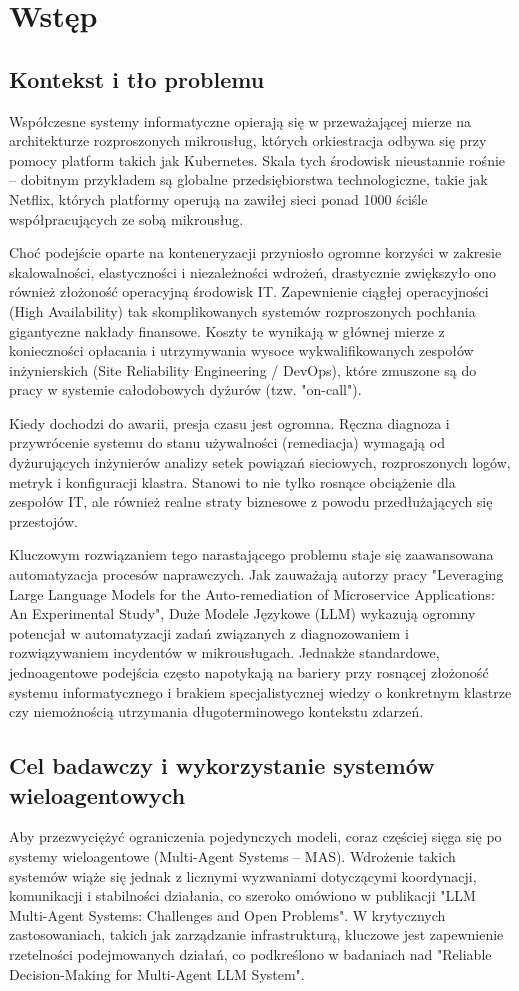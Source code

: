 \chapter{Wstęp}
\section{Kontekst i tło problemu}
Współczesne systemy informatyczne opierają się w przeważającej mierze na architekturze rozproszonych mikrousług, których orkiestracja odbywa się przy pomocy platform takich jak Kubernetes. Skala tych środowisk nieustannie rośnie – dobitnym przykładem są globalne przedsiębiorstwa technologiczne, takie jak Netflix, których platformy operują na zawiłej sieci ponad 1000 ściśle współpracujących ze sobą mikrousług.

Choć podejście oparte na konteneryzacji przyniosło ogromne korzyści w zakresie skalowalności, elastyczności i niezależności wdrożeń, drastycznie zwiększyło ono również złożoność operacyjną środowisk IT. Zapewnienie ciągłej operacyjności (High Availability) tak skomplikowanych systemów rozproszonych pochłania gigantyczne nakłady finansowe. Koszty te wynikają w głównej mierze z konieczności opłacania i utrzymywania wysoce wykwalifikowanych zespołów inżynierskich (Site Reliability Engineering / DevOps), które zmuszone są do pracy w systemie całodobowych dyżurów (tzw. "on-call").

Kiedy dochodzi do awarii, presja czasu jest ogromna. Ręczna diagnoza i przywrócenie systemu do stanu używalności (remediacja) wymagają od dyżurujących inżynierów analizy setek powiązań sieciowych, rozproszonych logów, metryk i konfiguracji klastra. 
Stanowi to nie tylko rosnące obciążenie dla zespołów IT, ale również realne straty biznesowe z powodu przedłużających się przestojów.

Kluczowym rozwiązaniem tego narastającego problemu staje się zaawansowana automatyzacja procesów naprawczych. Jak zauważają autorzy pracy "Leveraging Large Language Models for the Auto-remediation of Microservice Applications: An Experimental Study", Duże Modele Językowe (LLM) wykazują ogromny potencjał w automatyzacji zadań związanych z diagnozowaniem i rozwiązywaniem incydentów w mikrousługach. 
Jednakże standardowe, jednoagentowe podejścia często napotykają na bariery przy rosnącej złożoność systemu informatycznego i brakiem specjalistycznej wiedzy o konkretnym klastrze czy niemożnością utrzymania długoterminowego kontekstu zdarzeń. 

\section{Cel badawczy i wykorzystanie systemów wieloagentowych}
Aby przezwyciężyć ograniczenia pojedynczych modeli, coraz częściej sięga się po systemy wieloagentowe (Multi-Agent Systems – MAS). 
Wdrożenie takich systemów wiąże się jednak z licznymi wyzwaniami dotyczącymi koordynacji, komunikacji i stabilności działania, co szeroko omówiono w publikacji 
"LLM Multi-Agent Systems: Challenges and Open Problems". 
W krytycznych zastosowaniach, takich jak zarządzanie infrastrukturą, kluczowe jest zapewnienie rzetelności podejmowanych działań, co podkreślono w badaniach nad 
"Reliable Decision-Making for Multi-Agent LLM System".

